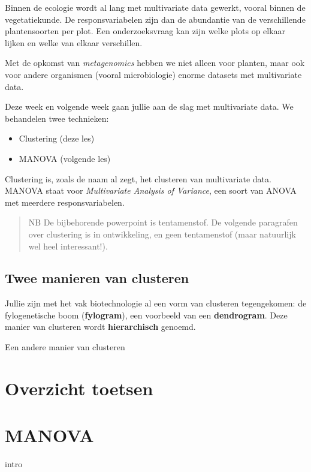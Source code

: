 \documentclass[]{book}
\providecommand{\tightlist}{%
  \setlength{\itemsep}{0pt}\setlength{\parskip}{0pt}}
\theoremstyle{definition}
\theoremstyle{definition}
\theoremstyle{definition}
\theoremstyle{remark}
\let\BeginKnitrBlock\begin \let\EndKnitrBlock\end
\begin{document}
Binnen de ecologie wordt al lang met multivariate data gewerkt, vooral
binnen de vegetatiekunde. De responsvariabelen zijn dan de abundantie
van de verschillende plantensoorten per plot. Een onderzoeksvraag kan
zijn welke plots op elkaar lijken en welke van elkaar verschillen.

Met de opkomst van \emph{metagenomics} hebben we niet alleen voor
planten, maar ook voor andere organismen (vooral microbiologie) enorme
datasets met multivariate data.

Deze week en volgende week gaan jullie aan de slag met multivariate
data. We behandelen twee technieken:

\begin{itemize}
\tightlist
\item
  Clustering (deze les)
\item
  MANOVA (volgende les)
\end{itemize}

Clustering is, zoals de naam al zegt, het clusteren van multivariate
data. MANOVA staat voor \emph{Multivariate Analysis of Variance}, een
soort van ANOVA met meerdere responsvariabelen.

\begin{quote}
NB De bijbehorende powerpoint is tentamenstof. De volgende paragrafen
over clustering is in ontwikkeling, en geen tentamenstof (maar
natuurlijk wel heel interessant!).
\end{quote}

\section{Twee manieren van clusteren}\label{twee-manieren-van-clusteren}

Jullie zijn met het vak biotechnologie al een vorm van clusteren
tegengekomen: de fylogenetische boom (\textbf{fylogram}), een voorbeeld
van een \textbf{dendrogram}. Deze manier van clusteren wordt
\textbf{hierarchisch} genoemd.

Een andere manier van clusteren

\chapter{Overzicht toetsen}\label{overzicht-toetsen}

\BeginKnitrBlock{ABD}
\EndKnitrBlock{ABD}

\chapter{MANOVA}\label{manova}

intro
\end{document}
